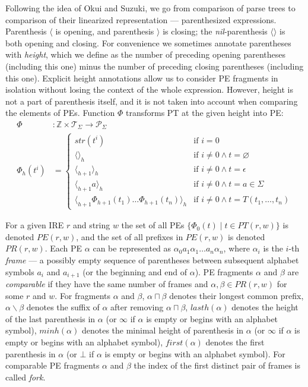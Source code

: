 \documentclass[AMA,STIX1COL]{WileyNJD-v2}
\newcommand{\Xl}{\langle}
\newcommand{\Xr}{\rangle}
\newcommand{\Xm}{\langle\!\rangle}
\newcommand{\XP}{\mathcal{P}}
\newcommand{\XT}{\mathcal{T}}
\newcommand{\YZ}{\mathbb{Z}}
\newcommand{\PT}{PT}
\newcommand{\PE}{P\!E}
\newcommand{\PR}{P\!R}
\begin{document}
Following the idea of Okui and Suzuki,
we go from comparison of parse trees to comparison of their linearized representation --- parenthesized expressions.
Parenthesis $\Xl$ is opening, and
parenthesis $\Xr$ is closing;
the \emph{nil}-parenthesis $\Xm$ is both opening and closing.
For convenience we sometimes annotate parentheses with \emph{height},
which we define as the number of preceding opening parentheses (including this one)
minus the number of preceding closing parentheses (including this one).
Explicit height annotations allow us to consider PE fragments in isolation
without losing the context of the whole expression.
However, height is not a part of parenthesis itself,
and it is not taken into account when comparing the elements of PEs.
Function $\Phi$ transforms PT at the given height into PE:
%
    \begin{align*}
    \Phi &: \YZ \times \XT_\Sigma \rightarrow \XP_\Sigma
    \\
    \Phi_{h}(t^{i}) &= \begin{cases}
        str(t^{i})                                            &\text{if } i = 0 \\[-0.2em]
        \Xm_h                                                 &\text{if } i \neq 0 \wedge t = \varnothing \\[-0.2em]
        \Xl_{h+1} \Xr_h                                       &\text{if } i \neq 0 \wedge t = \epsilon \\[-0.2em]
        \Xl_{h+1} a \Xr_h                                     &\text{if } i \neq 0 \wedge t = a \in \Sigma \\[-0.2em]
        \Xl_{h+1} \Phi_{h+1}(t_1) \dots \Phi_{h+1}(t_n) \Xr_h &\text{if } i \neq 0 \wedge t = T(t_1, \dots, t_n)
    \end{cases}
    \end{align*}

For a given IRE $r$ and string $w$ the set of all PEs $\big\{ \Phi_{0}(t) \mid t \in \PT(r, w) \big\}$ is denoted $\PE(r, w)$,
and the set of all prefixes in $\PE(r, w)$ is denoted $\PR(r, w)$.
Each PE $\alpha$ can be represented as $\alpha_0 a_1 \alpha_1 \dots a_n \alpha_n$,
where $\alpha_i$ is the $i$-th \emph{frame} --- a possibly empty sequence of parentheses between
subsequent alphabet symbols $a_i$ and $a_{i+1}$ (or the beginning and end of $\alpha$).
PE fragments $\alpha$ and $\beta$ are \emph{comparable}
if they have the same number of frames and $\alpha, \beta \in \PR(r, w)$ for some $r$ and $w$.
%
For fragments $\alpha$ and $\beta$,
$\alpha \sqcap \beta$ denotes their longest common prefix,
$\alpha \backslash \beta$ denotes the suffix of $\alpha$ after removing $\alpha \sqcap \beta$,
$lasth(\alpha)$ denotes the height of the last parenthesis in $\alpha$ (or $\infty$ if $\alpha$ is empty or begins with an alphabet symbol),
$minh(\alpha)$ denotes the minimal height of parenthesis in $\alpha$ (or $\infty$ if $\alpha$ is empty or begins with an alphabet symbol),
$f\!irst(\alpha)$ denotes the first parenthesis in $\alpha$ (or $\bot$ if $\alpha$ is empty or begins with an alphabet symbol).
For comparable PE fragments $\alpha$ and $\beta$ the index of the first distinct pair of frames is called \emph{fork}.
\end{document}
